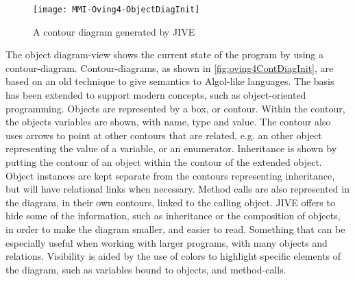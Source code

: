 \begin{figure}[H]
	\centering
	\texttt{[image: MMI-Oving4-ObjectDiagInit]}
	\caption{A contour diagram generated by JIVE}
	\label{fig:oving4ContDiagInit}
\end{figure}
The object diagram-view shows the current state of the program by using a contour-diagram.
Contour-diagrams, as shown in \autoref{fig:oving4ContDiagInit}, are based on an old technique to give semantics to Algol-like languages.
The basis has been extended to support modern concepts, such as object-oriented programming.
Objects are represented by a box, or contour.
Within the contour, the objects variables are shown, with name, type and value.
The contour also uses arrows to point at other contours that are related, e.g. an other object representing the value of a variable, or an enumerator.
Inheritance is shown by putting the contour of an object within the contour of the extended object. 
Object instances are kept separate from the contours representing inheritance, but will have relational links when necessary.
Method calls are also represented in the diagram, in their own contours, linked to the calling object.
JIVE offers to hide some of the information, such as inheritance or the composition of objects, in order to make the diagram smaller, and easier to read.
Something that can be especially useful when working with larger programs, with many objects and relations.
Visibility is aided by the use of colors to highlight specific elements of the diagram, such as variables bound to objects, and method-calls.
~\\

